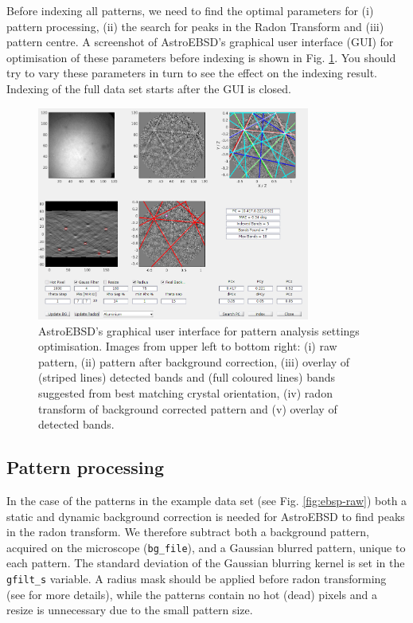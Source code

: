 \documentclass[11pt, twoside]{article}
\begin{document}
Before indexing all patterns, we need to find the optimal parameters for (i) pattern processing, (ii) the search for peaks in the Radon Transform and (iii) pattern centre. A screenshot of AstroEBSD's graphical user interface (GUI) for optimisation of these parameters before indexing is shown in Fig. \ref{fig:astroebsd-gui}. You should try to vary these parameters in turn to see the effect on the indexing result. Indexing of the full data set starts after the GUI is closed.

\begin{figure}[htb]
  \centering
  \includegraphics[width=0.8\textwidth]{figurer/astroebsd_gui/gui2.png}
  \caption{AstroEBSD's graphical user interface for pattern analysis settings optimisation. Images from upper left to bottom right: (i) raw pattern, (ii) pattern after background correction, (iii) overlay of (striped lines) detected bands and (full coloured lines) bands suggested from best matching crystal orientation, (iv) radon transform of background corrected pattern and (v) overlay of detected bands.}
  \label{fig:astroebsd-gui}
\end{figure}

\subsection{Pattern processing}

In the case of the patterns in the example data set (see Fig. \ref{fig:ebsp-raw}) both a static and dynamic background correction is needed for AstroEBSD to find peaks in the radon transform. We therefore subtract both a background pattern, acquired on the microscope (\texttt{bg\_file}), and a Gaussian blurred pattern, unique to each pattern. The standard deviation of the Gaussian blurring kernel is set in the \texttt{gfilt\_s} variable. A radius mask should be applied before radon transforming (see \cite{Britton2018} for more details), while the patterns contain no hot (dead) pixels and a resize is unnecessary due to the small pattern size.
\end{document}
